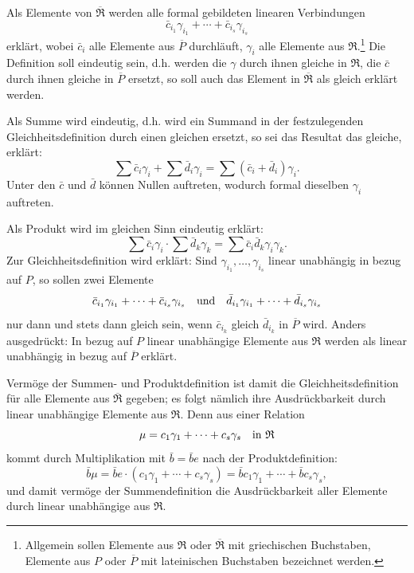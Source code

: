 \documentclass[11pt]{article}
\begin{document}
Als Elemente von $\overline{\mathfrak R}$ werden alle formal gebildeten linearen Verbindungen
\[
   \bar c_{i_1}\gamma_{i_1}+\cdots+\bar c_{i_s}\gamma_{i_s}
\]
erklärt, wobei $\bar c_i$ alle Elemente aus $\overline P$ durchläuft, $\gamma_i$ alle Elemente aus $\mathfrak R$.\footnote{Allgemein sollen Elemente aus $\mathfrak R$ oder $\overline{\mathfrak R}$ mit griechischen Buchstaben, Elemente aus $P$ oder $\overline P$ mit lateinischen Buchstaben bezeichnet werden.} Die Definition soll eindeutig sein, d.h. werden die $\gamma$ durch ihnen gleiche in $\mathfrak R$, die $\bar c$ durch ihnen gleiche in $\overline P$ ersetzt, so soll auch das Element in $\overline{\mathfrak R}$ als gleich erklärt werden.

Als Summe wird eindeutig, d.h. wird ein Summand in der festzulegenden Gleichheitsdefinition durch einen gleichen ersetzt, so sei das Resultat das gleiche, erklärt:
\[
   \sum \bar c_i\gamma_i+\sum \bar d_i\gamma_i
   =\sum(\bar c_i+\bar d_i)\gamma_i .
\]
Unter den $\bar c$ und $\bar d$ können Nullen auftreten, wodurch formal dieselben $\gamma_i$ auftreten.

Als Produkt wird im gleichen Sinn eindeutig erklärt:
\[
   \sum \bar c_i\gamma_i\cdot \sum \bar d_k\gamma_k
   =\sum \bar c_i\bar d_k\gamma_i\gamma_k .
\]
Zur Gleichheitsdefinition wird erklärt: Sind $\gamma_{i_1},\ldots,\gamma_{i_s}$ linear unabhängig in bezug auf $P$, so sollen zwei Elemente
\[
   \bar c_{i_1}\gamma_{i_1}+\cdots+\bar c_{i_s}\gamma_{i_s}
   \quad\hbox{und}\quad
   \bar d_{i_1}\gamma_{i_1}+\cdots+\bar d_{i_s}\gamma_{i_s}
\]
nur dann und stets dann gleich sein, wenn $\bar c_{i_k}$ gleich $\bar d_{i_k}$ in $\overline P$ wird. Anders ausgedrückt: In bezug auf $P$ linear unabhängige Elemente aus $\mathfrak R$ werden als linear unabhängig in bezug auf $\overline P$ erklärt.

Vermöge der Summen- und Produktdefinition ist damit die Gleichheitsdefinition für alle Elemente aus $\overline{\mathfrak R}$ gegeben; es folgt nämlich ihre Ausdrückbarkeit durch linear unabhängige Elemente aus $\mathfrak R$. Denn aus einer Relation
\[
   \mu=c_1\gamma_1+\cdots+c_s\gamma_s\quad\hbox{in }\mathfrak R
\]
kommt durch Multiplikation mit $\bar b=\bar b e$ nach der Produktdefinition:
\[
   \bar b\mu=\bar b e\cdot(c_1\gamma_1+\cdots+c_s\gamma_s)
      =\bar b c_1\gamma_1+\cdots+\bar b c_s\gamma_s,
\]
und damit vermöge der Summendefinition die Ausdrückbarkeit aller Elemente durch linear unabhängige aus $\mathfrak R$.
\end{document}
